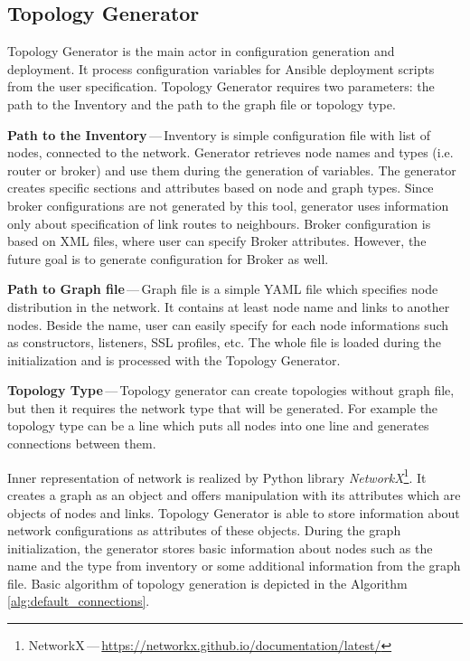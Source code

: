 \subsection{Topology Generator}
Topology Generator is the main actor in configuration generation and deployment. It process configuration variables for Ansible deployment scripts from the user specification. Topology Generator requires two parameters: the path to the Inventory and the path to the graph file or topology type.

\begin{description}
	\item \textbf{Path to the Inventory}\,---\,Inventory is simple configuration file with list of nodes, connected to the network. Generator retrieves node names and types (i.e. router or broker) and use them during the generation of variables. The generator creates specific sections and attributes based on node and graph types. Since broker configurations are not generated by this tool, generator uses information only about specification of link routes to neighbours. Broker configuration is based on XML files, where user can specify Broker attributes. However, the future goal is to generate configuration for Broker as well.
	\item \textbf{Path to Graph file}\,---\,Graph file is a simple YAML file which specifies node distribution in the network. It contains at least node name and links to another nodes. Beside the name, user can easily specify for each node informations such as constructors, listeners, SSL profiles, etc. The whole file is loaded during the initialization and is processed with the Topology Generator.
	\item \textbf{Topology Type}\,---\,Topology generator can create topologies without graph file, but then it requires the network type that will be generated. For example the topology type can be a line which puts all nodes into one line and generates connections between them.
\end{description}

Inner representation of network is realized by Python library \emph{NetworkX}\footnote{NetworkX\,---\,\url{https://networkx.github.io/documentation/latest/}}. It creates a graph as an object and offers manipulation with its attributes which are objects of nodes and links. Topology Generator is able to store information about network configurations as attributes of these objects. During the graph initialization, the generator stores basic information about nodes such as the name and the type from inventory or some additional information from the graph file. Basic algorithm of topology generation is depicted in the Algorithm \ref{alg:default_connections}.

